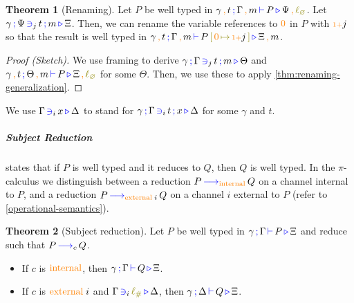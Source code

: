 \documentclass[sigplan,10pt,anonymous,review]{acmart}
\theoremstyle{definition}
\newtheorem{nitheorem}{Theorem}
\newcommand{\picalc}{$\pi$-calculus}
\newcommand{\type}[1]{\textcolor{blue}{\operatorname{#1}}}
\newcommand{\constr}[1]{\textcolor{orange}{\operatorname{#1}}}
\newcommand{\func}[1]{\textcolor{olive}{\operatorname{#1}}}
\newcommand{\suc}{\constr{\scriptstyle 1+}}
\newcommand{\comma}{\, \constr{,} \,}
\newcommand{\subst}[3]{#1 \, \func{[} \, #3 \, \func{\mapsto} \,#2 \, \func{]}}
\newcommand{\lz}{\func{\ell_{\varnothing}}}
\newcommand{\lio}{\func{\ell_{\#}}}
\newcommand{\reduce}[1]{\, \type{\longrightarrow}_{#1} \,}
\newcommand{\types}[4]{#1 \, \type{;} \, #2 \, \type{\vdash} \, #3 \, \type{\triangleright} \, #4}
\newcommand{\contains}[6]{#1 \, \type{;} \, #2 \, \type{\ni}_{#3} \, #4 \, \type{;} \, #5 \, \type{\triangleright} \, #6}
\newcommand{\containsusage}[4]{#1 \, \type{\ni}_{#2} \, #3 \, \type{\triangleright} \, #4}
\begin{document}
\begin{nitheorem}[Renaming]
  \label{thm:renaming}
  Let $P$ be well typed in $\types{\gamma \comma t}{\Gamma \comma m}{P}{\Psi \comma \lz}$.
  Let $\contains{\gamma}{\Psi}{j}{t}{m}{\Xi}$.
  Then, we can rename the variable references to $\constr{0}$ in $P$ with $\suc j$ so that the result is well typed in $\types{\gamma \comma t}{\Gamma \comma m}{\subst{P}{\suc j}{\constr{0}}}{\Xi \comma m}$.
\end{nitheorem}
\begin{proof}[Proof (Sketch)]
  We use framing to derive $\contains{\gamma}{\Gamma}{j}{t}{m}{\Theta}$ and $\types{\gamma \comma t}{\Theta \comma m}{P}{\Xi \comma \lz}$ for some $\Theta$.
  Then, we use these to apply \autoref{thm:renaming-generalization}.
\end{proof}


  We use $\containsusage{\Gamma}{i}{x}{\Delta}$ to stand for $\contains{\gamma}{\Gamma}{i}{t}{x}{\Delta}$ for some $\gamma$ and $t$.

\subparagraph*{Subject Reduction}
states that if $P$ is well typed and it reduces to $Q$, then $Q$ is well typed.
In the \picalc{} we distinguish between a reduction $P \reduce{\constr{internal}} Q$ on a channel internal to $P$, and a reduction $P \reduce{\constr{external} \; i} Q$ on a channel $i$ external to $P$ (refer to \autoref{operational-semantics}).

\begin{nitheorem}[Subject reduction]
  \label{thm:subject-reduction}
  Let $P$ be well typed in $\types{\gamma}{\Gamma}{P}{\Xi}$ and reduce such that $P \reduce{c} Q$.
  \begin{itemize}
    \item If $c$ is $\constr{internal}$, then $\types{\gamma}{\Gamma}{Q}{\Xi}$.
    \item If $c$ is $\constr{external} \; i$ and $\containsusage{\Gamma}{i}{\lio}{\Delta}$, then $\types{\gamma}{\Delta}{Q}{\Xi}$.
  \end{itemize}
\end{nitheorem}
\end{document}
